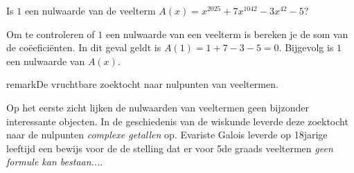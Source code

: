 \documentclass{ximera}
\begin{document}
\begin{exercise}
    Is \(1\) een nulwaarde van de veelterm \( A(x) = x^2025 + 7x^1042 - 3x^42 - 5\)? 
    \begin{oplossing}
    Om te controleren of \(1\) een nulwaarde van een veelterm is bereken je de som van de coëeficiënten. In dit geval geldt is \(A(1) = 1 + 7 - 3 - 5 = 0\). Bijgevolg is \(1\) een nulwaarde van \(A(x)\).  
    \end{oplossing}
\end{exercise}



\begin{expandable}{remark}{De vruchtbare zoektocht naar nulpunten van veeltermen.}

    Op het eerste zicht lijken de nulwaarden van veeltermen geen bijzonder interessante objecten. In de geschiedenis van de wiskunde leverde deze zoektocht naar de nulpunten \textit{complexe getallen} op.  
    Evariste Galois leverde op 18jarige leeftijd een bewijs voor de de stelling dat er voor 5de graads veeltermen \textit{geen formule kan bestaan...}. 
    
\end{expandable}
\end{document}
